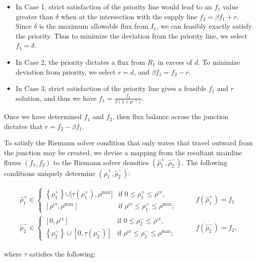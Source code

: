 \begin{itemize}
	\item In Case 1, strict satisfaction of the priority line would lead to an $f_1$ value greater than $\delta$ when at the intersection with the supply line $f_2 = \beta f_1 + r$. Since $\delta$ is the maximum allowable flux from $I_1$, we can feasibly exactly satisfy the priority. Thus to minimize the deviation from the priority line, we select $f_1 = \delta$.
	\item In Case 2, the priority dictates a flux from $R_1$ in excess of $d$. To minimize deviation from priority, we select $r = d$, and $\beta f_1 = f_2 - r$.
	\item In Case 3, strict satisfaction of the priority line gives a feasible $f_1$ and $r$ solution, and thus we have $f_1 = \frac{f_2}{\beta \left(1 + p^{-1}\right)}$.
\end{itemize}


Once we have determined $f_1$ and $f_2$, then flux balance across the junction dictates that $r = f_2 - \beta f_1$.

To satisfy the Riemann solver condition that only waves that travel outward from the junction may be created, we devise a mapping from the resultant mainline fluxes $\left(f_1, f_2\right)$ to the Riemann solver densities $\left(\hat{\rho}_1^+, \hat{\rho}_2^-\right)$. The following conditions uniquely determine $\left(\hat{\rho}_1^+, \hat{\rho}_2^-\right)$:

\begin{align}
\hat{\rho}_1^+ \in
\begin{cases}
\left\{\rho_1^+\right\}\cup ]\tau(\rho_1^+),\rho^{\max}] & \text{if } 0 \le \rho_1^+ \le \rho^\text{cr}, \\
\left[\rho^{\text{cr}}, \rho^{\max}\right] & \text{if }  \rho^\text{cr} \le  \rho_1^+ \le \rho^{\max};
\end{cases} &\quad  & f\left(\hat{\rho}_1^+\right) = f_1 \\
\hat{\rho}_2^- \in
\begin{cases}
\left[0,\rho^{\text{cr}}\right] & \text{if } 0 \le \rho_2^- \le \rho^\text{cr}, \\
 \left\{\rho_2^-\right\}\cup [0,\tau(\rho_2^-)]
 & \text{if }  \rho^\text{cr} \le  \rho_2^- \le \rho^{\max};
\end{cases} &\quad  & f\left(\hat{\rho}_2^-\right) = f_2,
\end{align}

where $\tau$ satisfies the following:

